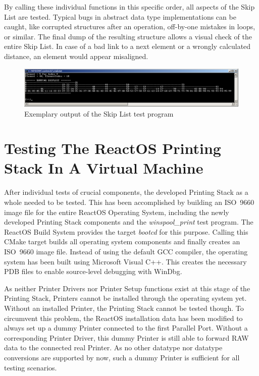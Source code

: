 By calling these individual functions in this specific order, all aspects of the Skip List are tested.
Typical bugs in abstract data type implementations can be caught, like corrupted structures after an operation, off-by-one mistakes in loops, or similar.
The final dump of the resulting structure allows a visual check of the entire Skip List.
In case of a bad link to a next element or a wrongly calculated distance, an element would appear misaligned.

\begin{figure}[b]
	\centering
	\includegraphics{images/skiplist_test.png}
	\caption{Exemplary output of the Skip List test program}
	\label{fig:skiplist_test}
\end{figure}


\section{Testing The ReactOS Printing Stack In A Virtual Machine}
After individual tests of crucial components, the developed Printing Stack as a whole needed to be tested.
This has been accomplished by building an ISO~9660 image file for the entire ReactOS Operating System, including the newly developed Printing Stack components and the \emph{winspool\_print} test program.
The ReactOS Build System provides the target \emph{bootcd} for this purpose.
Calling this CMake target builds all operating system components and finally creates an ISO~9660 image file.
Instead of using the default GCC compiler, the operating system has been built using Microsoft Visual C++.
This creates the necessary \gls{PDB} files to enable source-level debugging with WinDbg.

As neither Printer Drivers nor Printer Setup functions exist at this stage of the Printing Stack, Printers cannot be installed through the operating system yet.
Without an installed Printer, the Printing Stack cannot be tested though.
To circumvent this problem, the ReactOS installation data has been modified to always set up a dummy Printer connected to the first Parallel Port.
Without a corresponding Printer Driver, this dummy Printer is still able to forward RAW data to the connected real Printer.
As no other datatype nor datatype conversions are supported by now, such a dummy Printer is sufficient for all testing scenarios.

